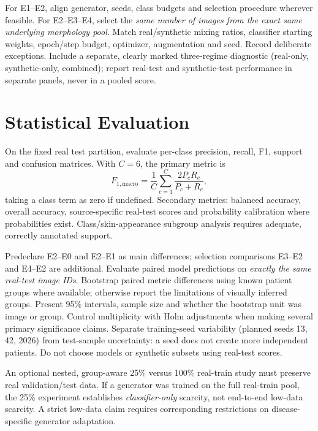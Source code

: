 \documentclass[11pt,a4paper]{article}
\begin{document}
For E1--E2, align generator, seeds, class budgets and selection procedure wherever feasible. For E2--E3--E4, select the \emph{same number of images from the exact same underlying morphology pool}. Match real/synthetic mixing ratios, classifier starting weights, epoch/step budget, optimizer, augmentation and seed. Record deliberate exceptions. Include a separate, clearly marked three-regime diagnostic (real-only, synthetic-only, combined); report real-test and synthetic-test performance in separate panels, never in a pooled score.

\section{Statistical Evaluation}
On the fixed real test partition, evaluate per-class precision, recall, F1, support and confusion matrices. With $C=6$, the primary metric is
\[
F_{1,\mathrm{macro}}=\frac{1}{C}\sum_{c=1}^{C}\frac{2P_cR_c}{P_c+R_c},
\]
taking a class term as zero if undefined. Secondary metrics: balanced accuracy, overall accuracy, source-specific real-test scores and probability calibration where probabilities exist. Class/skin-appearance subgroup analysis requires adequate, correctly annotated support.

Predeclare E2--E0 and E2--E1 as main differences; selection comparisons E3--E2 and E4--E2 are additional. Evaluate paired model predictions on \emph{exactly the same real-test image IDs}. Bootstrap paired metric differences using known patient groups where available; otherwise report the limitations of visually inferred groups. Present 95\% intervals, sample size and whether the bootstrap unit was image or group. Control multiplicity with Holm adjustments when making several primary significance claims. Separate training-seed variability (planned seeds 13, 42, 2026) from test-sample uncertainty: a seed does not create more independent patients. Do not choose models or synthetic subsets using real-test scores.

An optional nested, group-aware 25\% versus 100\% real-train study must preserve real validation/test data. If a generator was trained on the full real-train pool, the 25\% experiment establishes \emph{classifier-only} scarcity, not end-to-end low-data scarcity. A strict low-data claim requires corresponding restrictions on disease-specific generator adaptation.
\end{document}
